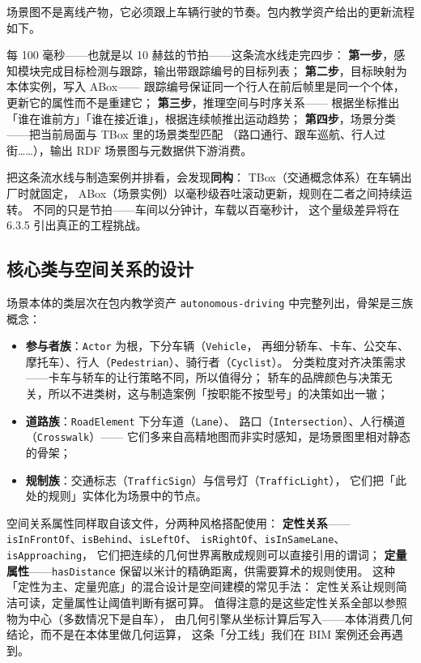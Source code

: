 场景图不是离线产物，它必须跟上车辆行驶的节奏。包内教学资产给出的更新流程如下。



每 100 毫秒——也就是以 10 赫兹的节拍——这条流水线走完四步：
\textbf{第一步}，感知模块完成目标检测与跟踪，输出带跟踪编号的目标列表；
\textbf{第二步}，目标映射为本体实例，写入 ABox——
跟踪编号保证同一个行人在前后帧里是同一个个体，更新它的属性而不是重建它；
\textbf{第三步}，推理空间与时序关系——
根据坐标推出「谁在谁前方」「谁在接近谁」，根据连续帧推出运动趋势；
\textbf{第四步}，场景分类——把当前局面与 TBox 里的场景类型匹配
（路口通行、跟车巡航、行人过街……），输出 RDF 场景图与元数据供下游消费。

把这条流水线与制造案例并排看，会发现\textbf{同构}：
TBox（交通概念体系）在车辆出厂时就固定，
ABox（场景实例）以毫秒级吞吐滚动更新，规则在二者之间持续运转。
不同的只是节拍——车间以分钟计，车载以百毫秒计，
这个量级差异将在 6.3.5 引出真正的工程挑战。

\subsection{核心类与空间关系的设计}

场景本体的类层次在包内教学资产 \texttt{autonomous-driving} 中完整列出，骨架是三族概念：
\begin{itemize}
\item \textbf{参与者族}：\texttt{Actor} 为根，下分车辆（\texttt{Vehicle}，
  再细分轿车、卡车、公交车、摩托车）、行人（\texttt{Pedestrian}）、骑行者（\texttt{Cyclist}）。
  分类粒度对齐决策需求——卡车与轿车的让行策略不同，所以值得分；
  轿车的品牌颜色与决策无关，所以不进类树，这与制造案例「按职能不按型号」的决策如出一辙；
\item \textbf{道路族}：\texttt{RoadElement} 下分车道（\texttt{Lane}）、
  路口（\texttt{Intersection}）、人行横道（\texttt{Crosswalk}）——
  它们多来自高精地图而非实时感知，是场景图里相对静态的骨架；
\item \textbf{规制族}：交通标志（\texttt{TrafficSign}）与信号灯（\texttt{TrafficLight}），
  它们把「此处的规则」实体化为场景中的节点。
\end{itemize}

空间关系属性同样取自该文件，分两种风格搭配使用：
\textbf{定性关系}——\texttt{isInFrontOf}、\texttt{isBehind}、\texttt{isLeftOf}、
\texttt{isRightOf}、\texttt{isInSameLane}、\texttt{isApproaching}，
它们把连续的几何世界离散成规则可以直接引用的谓词；
\textbf{定量属性}——\texttt{hasDistance} 保留以米计的精确距离，供需要算术的规则使用。
这种「定性为主、定量兜底」的混合设计是空间建模的常见手法：
定性关系让规则简洁可读，定量属性让阈值判断有据可算。
值得注意的是这些定性关系全部以参照物为中心（多数情况下是自车），
由几何引擎从坐标计算后写入——本体消费几何结论，而不是在本体里做几何运算，
这条「分工线」我们在 BIM 案例还会再遇到。

